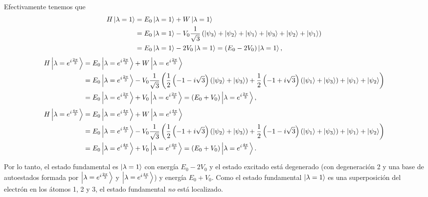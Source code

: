 \documentclass[10pt, a4paper]{article}
\numberwithin{equation}{subsection}
\begin{document}
Efectivamente tenemos que
\begin{align}
  H\ket{\lambda = 1} &= E_0\ket{\lambda = 1} + W\ket{\lambda = 1} \nonumber \\
    &= E_0\ket{\lambda = 1} - V_0\frac{1}{\sqrt{3}}\left(\ket{\psi_3} +
      \ket{\psi_2} + \ket{\psi_1} + \ket{\psi_3} + \ket{\psi_2} + \ket{\psi_1}
      \right) \nonumber \\
    &= E_0\ket{\lambda = 1} - 2V_0\ket{\lambda = 1} =
       (E_0 - 2V_0)\ket{\lambda = 1},
\end{align}
\begin{align}
  H\ket{\lambda = e^{i\frac{2\pi}{3}}} &=
    E_0\ket{\lambda = e^{i\frac{2\pi}{3}}} + W\ket{\lambda =
    e^{i\frac{2\pi}{3}}} \nonumber \\
    &= E_0\ket{\lambda = e^{i\frac{2\pi}{3}}} -V_0\frac{1}{\sqrt{3}}\left(
      \frac{1}{2}\left(-1 - i\sqrt{3}\right)\left(\ket{\psi_2} +
      \ket{\psi_3}\right) + \frac{1}{2}\left(-1 +
      i\sqrt{3}\right)\left(\ket{\psi_1} + \ket{\psi_3}\right) + \ket{\psi_1} +
      \ket{\psi_2}\right) \nonumber \\
    &= E_0\ket{\lambda = e^{i\frac{2\pi}{3}}} + V_0\ket{\lambda =
      e^{i\frac{2\pi}{3}}} 
     = (E_0 + V_0)\ket{\lambda = e^{i\frac{2\pi}{3}}},
\end{align}
\begin{align}
  H\ket{\lambda = e^{i\frac{4\pi}{3}}} &=
    E_0\ket{\lambda = e^{i\frac{4\pi}{3}}} + W\ket{\lambda =
    e^{i\frac{4\pi}{3}}} \nonumber \\
    &= E_0\ket{\lambda = e^{i\frac{4\pi}{3}}} -V_0\frac{1}{\sqrt{3}}\left(
      \frac{1}{2}\left(-1 + i\sqrt{3}\right)\left(\ket{\psi_2} +
      \ket{\psi_3}\right) + \frac{1}{2}\left(-1 -
      i\sqrt{3}\right)\left(\ket{\psi_1} + \ket{\psi_3}\right) + \ket{\psi_1} +
      \ket{\psi_2}\right) \nonumber \\
    &= E_0\ket{\lambda = e^{i\frac{4\pi}{3}}} + V_0\ket{\lambda =
      e^{i\frac{4\pi}{3}}} 
     = (E_0 + V_0)\ket{\lambda = e^{i\frac{4\pi}{3}}}.
\end{align}

Por lo tanto, el estado fundamental es $\ket{\lambda = 1}$ con energía $E_0 -
2V_0$ y el estado excitado está degenerado (con degeneración 2 y una base de
autoestados formada por $\ket{\lambda = e^{i\frac{2\pi}{3}}}$ y $\ket{\lambda =
e^{i\frac{4\pi}{3}}}$) y energía $E_0 + V_0$. Como el estado fundamental
$\ket{\lambda = 1}$ es una superposición del electrón en los átomos 1, 2 y 3,
el estado fundamental \emph{no} está localizado.
\end{document}
